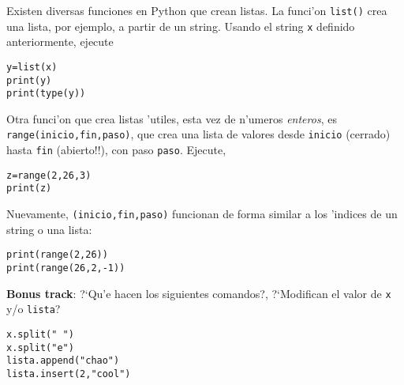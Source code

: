 \documentclass[11pt]{exam}
\begin{document}
\begin{questions}
\item Existen diversas funciones en Python que crean listas. La funci'on \texttt{list()} crea una lista, por ejemplo, a partir de un string. Usando el string \texttt{x} definido anteriormente, ejecute
\begin{verbatim}
y=list(x)
print(y)
print(type(y))
\end{verbatim}
\item Otra funci'on que crea listas 'utiles, esta vez de n'umeros \textit{enteros}, es \texttt{range(inicio,fin,paso)}, que crea una lista de valores desde \texttt{inicio} (cerrado) hasta \texttt{fin} (abierto!!), con paso \texttt{paso}. Ejecute,
\begin{verbatim}
z=range(2,26,3)
print(z)
\end{verbatim}
Nuevamente, \texttt{(inicio,fin,paso)} funcionan de forma similar a los 'indices de un string o una lista:
\begin{verbatim}
print(range(2,26))
print(range(26,2,-1))
\end{verbatim}
\end{questions}
\textbf{Bonus track}: 
?`Qu'e hacen los siguientes comandos?, ?`Modifican el valor de \texttt{x} y/o \texttt{lista}?
\begin{verbatim}
x.split(" ")
x.split("e")
lista.append("chao")
lista.insert(2,"cool")
\end{verbatim}
\end{document}
